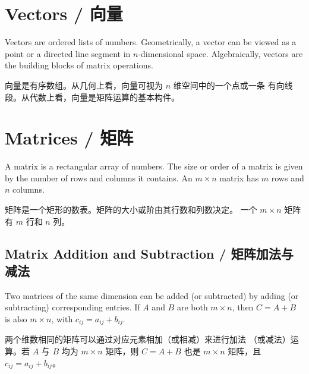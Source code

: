 \section{Vectors / 向量}

\begin{original}
Vectors are ordered lists of numbers.  Geometrically, a vector can be
viewed as a point or a directed line segment in $n$-dimensional space.
Algebraically, vectors are the building blocks of matrix operations.
\end{original}
\begin{translation}
向量是有序数组。从几何上看，向量可视为 $n$ 维空间中的一个点或一条
有向线段。从代数上看，向量是矩阵运算的基本构件。
\end{translation}

\section{Matrices / 矩阵}

\begin{original}
A matrix is a rectangular array of numbers.  The size or order of a
matrix is given by the number of rows and columns it contains.  An
$m \times n$ matrix has $m$ rows and $n$ columns.
\end{original}
\begin{translation}
矩阵是一个矩形的数表。矩阵的大小或阶由其行数和列数决定。
一个 $m \times n$ 矩阵有 $m$ 行和 $n$ 列。
\end{translation}

\subsection{Matrix Addition and Subtraction / 矩阵加法与减法}

\begin{original}
Two matrices of the same dimension can be added (or subtracted) by
adding (or subtracting) corresponding entries.  If $A$ and $B$ are both
$m \times n$, then $C = A + B$ is also $m \times n$, with
$c_{ij} = a_{ij} + b_{ij}$.
\end{original}
\begin{translation}
两个维数相同的矩阵可以通过对应元素相加（或相减）来进行加法
（或减法）运算。若 $A$ 与 $B$ 均为 $m \times n$ 矩阵，则
$C = A + B$ 也是 $m \times n$ 矩阵，且 $c_{ij} = a_{ij} + b_{ij}$。
\end{translation}

